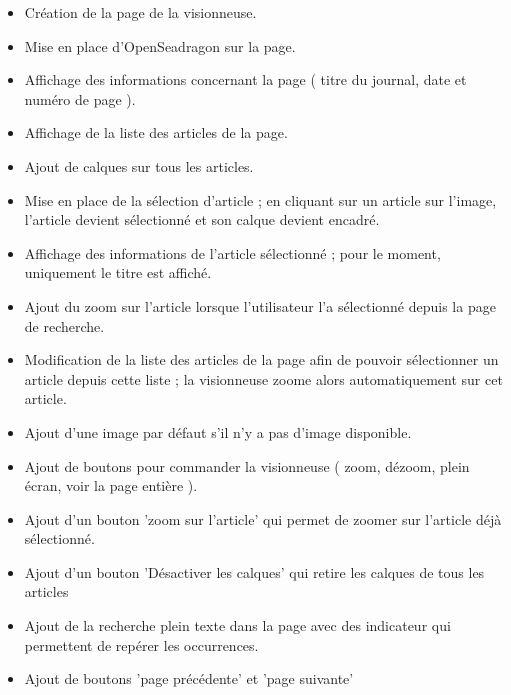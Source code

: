 \begin{itemize}
\setlength\itemsep{1em}

	\item Création de la page de la visionneuse.

	\item Mise en place d'OpenSeadragon sur la page.

	\item Affichage des informations concernant la page ( titre du journal, date et numéro de page ).

	\item Affichage de la liste des articles de la page.

	\item Ajout de calques sur tous les articles.

	\item Mise en place de la sélection d'article ; en cliquant sur un article sur l'image, l'article devient sélectionné et son calque devient encadré.

	\item Affichage des informations de l'article sélectionné ; pour le moment, uniquement le titre est affiché.

	\item Ajout du zoom sur l'article lorsque l'utilisateur l'a sélectionné depuis la page de recherche.

	\item Modification de la liste des articles de la page afin de pouvoir sélectionner un article depuis cette liste ; la visionneuse zoome alors automatiquement sur cet article.

	\item Ajout d'une image par défaut s'il n'y a pas d'image disponible.

	\item Ajout de boutons pour commander la visionneuse ( zoom, dézoom, plein écran, voir la page entière ).

	\item Ajout d'un bouton 'zoom sur l'article' qui permet de zoomer sur l'article déjà sélectionné.

	\item Ajout d'un bouton 'Désactiver les calques' qui retire les calques de tous les articles

	\item Ajout de la recherche plein texte dans la page avec des indicateur qui permettent de repérer les occurrences.

	\item Ajout de boutons 'page précédente' et 'page suivante'


\end{itemize}
